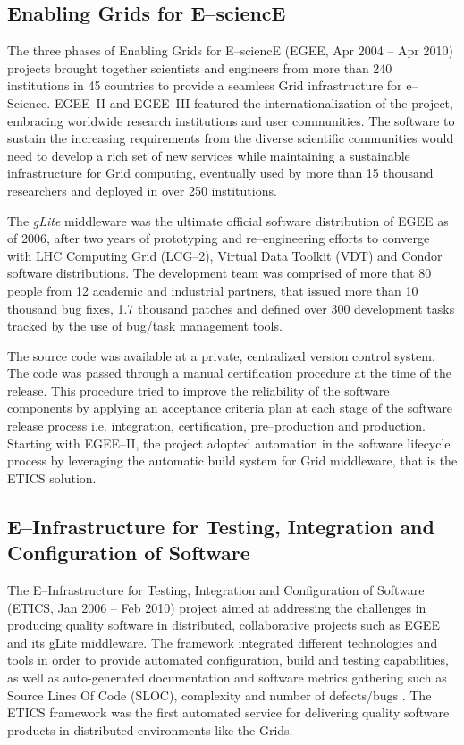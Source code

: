 \documentclass[journal]{IEEEtran}
\begin{document}
\subsection{Enabling Grids for E--sciencE}

The three phases of Enabling Grids for E--sciencE (EGEE, Apr 2004 -- Apr 2010)
\cite{cordis:egee, cordis:egee2, cordis:egee3} projects brought together
scientists and engineers from more than 240 institutions in 45 countries to
provide a seamless Grid infrastructure for e--Science. EGEE--II and EGEE--III
featured the internationalization of the project, embracing worldwide research
institutions and user communities. The software to sustain the increasing
requirements from the diverse scientific communities would need to develop a
rich set of new services while maintaining a sustainable infrastructure for
Grid computing, eventually used by more than 15 thousand researchers and deployed in
over 250 institutions.

The {\sl gLite} middleware \cite{glite} was the ultimate
official software distribution of EGEE as of 2006, after two years of prototyping and
re--engineering efforts to converge with LHC Computing Grid (LCG--2), Virtual
Data Toolkit (VDT) and Condor \cite{condor} software distributions. The
development team was comprised of more that 80 people from 12 academic and
industrial partners, that issued more than 10 thousand bug fixes, 1.7 thousand patches and
defined over 300 development tasks tracked by the use of bug/task management tools.

The source code was available at a private, centralized version control system.
The code was passed through a manual certification procedure at the time of the release. 
This procedure tried to improve the reliability of the software components by applying an
acceptance criteria plan at each stage of the software release process 
\cite{egee:acceptance-criteria} i.e. integration, certification, pre--production and 
production. Starting with EGEE--II, the project adopted automation in the software
lifecycle process by leveraging the automatic build system for Grid middleware, that is
the ETICS \cite{etics} solution.

\subsection{E--Infrastructure for Testing, Integration and Configuration of Software}

The E--Infrastructure for Testing, Integration and Configuration of Software
\cite{cordis:etics, cordis:etics2} (ETICS, Jan 2006 -- Feb 2010) project aimed
at addressing the challenges in producing quality software in distributed,
collaborative projects such as EGEE and its gLite middleware. The framework
integrated different technologies and tools in order to provide automated configuration,
build and testing capabilities, as well as auto-generated documentation and
software metrics gathering such as Source Lines Of Code (SLOC), complexity and
number of defects/bugs \cite{etics}. The ETICS framework was the first automated
service for delivering quality software products in distributed environments like
the Grids.
\end{document}
